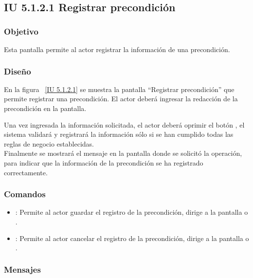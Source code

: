 \subsection{IU 5.1.2.1 Registrar precondición}

\subsubsection{Objetivo}
	
	Esta pantalla permite al actor registrar la información de una precondición.

\subsubsection{Diseño}

    En la figura ~\ref{IU 5.1.2.1} se muestra la pantalla ``Registrar precondición'' que permite registrar una precondición. El actor deberá ingresar la redacción de la precondición en la pantalla.
    
    Una vez ingresada la información solicitada, el actor deberá oprimir el botón , el sistema validará y registrará la información sólo si se han cumplido todas las reglas de negocio establecidas.  \\
    
    Finalmente se mostrará el mensaje  en la pantalla donde se solicitó la operación, para indicar que la información de la precondición
    se ha registrado correctamente.        




\subsubsection{Comandos}
\begin{itemize}
	\item {}: Permite al actor guardar el registro de la precondición, dirige a la pantalla  o .
	\item {}: Permite al actor cancelar el registro de la precondición, dirige a la pantalla  o .
\end{itemize}

\subsubsection{Mensajes}

